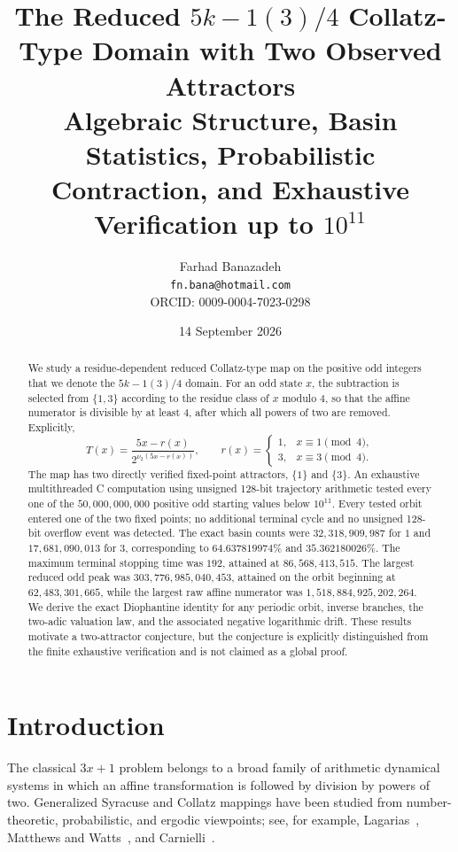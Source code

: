 \documentclass[11pt]{article}
\title{The Reduced $5k-1(3)/4$ Collatz-Type Domain with Two Observed Attractors\\\large Algebraic Structure, Basin Statistics, Probabilistic Contraction, and Exhaustive Verification up to $10^{11}$}
\author{Farhad Banazadeh\\\texttt{fn.bana@hotmail.com}\\ORCID: 0009-0004-7023-0298}
\date{14 September 2026}
\newcommand{\vTwo}{\nu_2}
\begin{document}
\maketitle

\begin{abstract}
We study a residue-dependent reduced Collatz-type map on the positive odd integers that we denote the $5k-1(3)/4$ domain. For an odd state $x$, the subtraction is selected from $\{1,3\}$ according to the residue class of $x$ modulo $4$, so that the affine numerator is divisible by at least $4$, after which all powers of two are removed. Explicitly,
\[
T(x)=\frac{5x-r(x)}{2^{\vTwo(5x-r(x))}},\qquad
r(x)=\begin{cases}1,&x\equiv1\pmod4,\\3,&x\equiv3\pmod4.\end{cases}
\]
The map has two directly verified fixed-point attractors, $\{1\}$ and $\{3\}$. An exhaustive multithreaded C computation using unsigned 128-bit trajectory arithmetic tested every one of the $50,000,000,000$ positive odd starting values below $10^{11}$. Every tested orbit entered one of the two fixed points; no additional terminal cycle and no unsigned 128-bit overflow event was detected.
The exact basin counts were $32,318,909,987$ for $1$ and $17,681,090,013$ for $3$, corresponding to $64.637819974\%$ and $35.362180026\%$. The maximum terminal stopping time was $192$, attained at $86,568,413,515$. The largest reduced odd peak was $303,776,985,040,453$, attained on the orbit beginning at $62,483,301,665$, while the largest raw affine numerator was $1,518,884,925,202,264$. We derive the exact Diophantine identity for any periodic orbit, inverse branches, the two-adic valuation law, and the associated negative logarithmic drift.
These results motivate a two-attractor conjecture, but the conjecture is explicitly distinguished from the finite exhaustive verification and is not claimed as a global proof.
\end{abstract}

\section{Introduction}

The classical $3x+1$ problem belongs to a broad family of arithmetic dynamical systems in which an affine transformation is followed by division by powers of two. Generalized Syracuse and Collatz mappings have been studied from number-theoretic, probabilistic, and ergodic viewpoints; see, for example, Lagarias~\cite{Lagarias1985}, Matthews and Watts~\cite{MatthewsWatts1985}, and Carnielli~\cite{Carnielli2015}.
\end{document}
